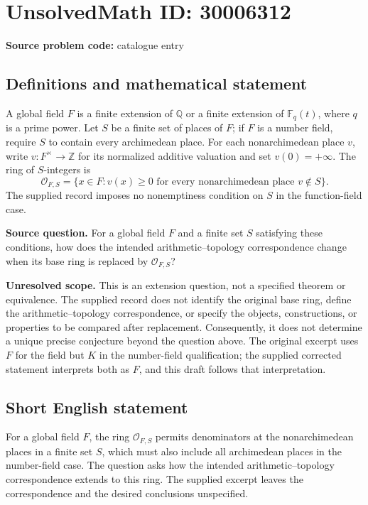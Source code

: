 \documentclass[11pt]{article}
\newcommand{\Z}{\mathbb{Z}}
\newcommand{\Q}{\mathbb{Q}}
\newcommand{\F}{\mathbb{F}}
\begin{document}
\section*{UnsolvedMath ID: 30006312}
\textbf{Source problem code:} catalogue entry
\subsection{Definitions and mathematical statement}
A global field \(F\) is a finite extension of \(\Q\) or a finite extension of \(\F_q(t)\), where \(q\) is a prime power. Let \(S\) be a finite set of places of \(F\); if \(F\) is a number field, require \(S\) to contain every archimedean place. For each nonarchimedean place \(v\), write \(v:F^\times\to\Z\) for its normalized additive valuation and set \(v(0)=+\infty\). The ring of \(S\)-integers is
\[
\mathcal O_{F,S}=\{x\in F: v(x)\geq 0\text{ for every nonarchimedean place }v\notin S\}.
\]
The supplied record imposes no nonemptiness condition on \(S\) in the function-field case.

\textbf{Source question.} For a global field \(F\) and a finite set \(S\) satisfying these conditions, how does the intended arithmetic--topology correspondence change when its base ring is replaced by \(\mathcal O_{F,S}\)?

\textbf{Unresolved scope.} This is an extension question, not a specified theorem or equivalence. The supplied record does not identify the original base ring, define the arithmetic--topology correspondence, or specify the objects, constructions, or properties to be compared after replacement. Consequently, it does not determine a unique precise conjecture beyond the question above. The original excerpt uses \(F\) for the field but \(K\) in the number-field qualification; the supplied corrected statement interprets both as \(F\), and this draft follows that interpretation.
\subsection{Short English statement}
For a global field \(F\), the ring \(\mathcal O_{F,S}\) permits denominators at the nonarchimedean places in a finite set \(S\), which must also include all archimedean places in the number-field case. The question asks how the intended arithmetic--topology correspondence extends to this ring. The supplied excerpt leaves the correspondence and the desired conclusions unspecified.
\end{document}
